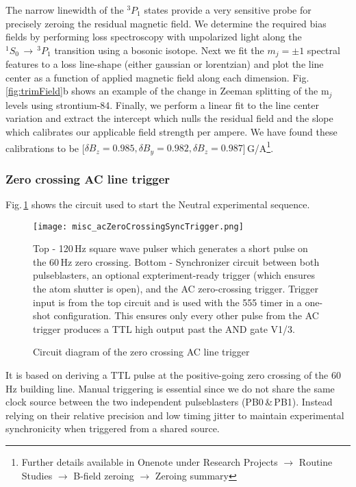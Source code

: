 The narrow linewidth of the $^3P_1$ states provide a very sensitive probe for precisely zeroing the residual magnetic field.
We determine the required bias fields by performing loss spectroscopy with unpolarized light along the $^1S_0\,\rightarrow\,^3P_1$ transition using a bosonic isotope.
Next we fit the $m_j=\pm1$ spectral features to a loss line-shape (either gaussian or lorentzian) and plot the line center as a function of applied magnetic field along each dimension.
Fig.\,\ref{fig:trimField}b shows an example of the change in Zeeman splitting of the m$_j$ levels using strontium-84.
Finally, we perform a linear fit to the line center variation and extract the intercept which nulls the residual field and the slope which calibrates our applicable field strength per ampere. 
We have found these calibrations to be [$\delta B_z = 0.985, \delta B_y = 0.982, \delta B_z = 0.987$]\,G/A\footnote{Further details available in Onenote under Research Projects $\rightarrow$ Routine Studies $\rightarrow$ B-field zeroing $\rightarrow$ Zeroing summary}.

\subsubsection{Zero crossing AC line trigger} \label{sec:expTrig}
Fig.\,\ref{fig:zeroCrossTrig} shows the circuit used to start the Neutral experimental sequence.
	\begin{figure}
		\centerline{
		\texttt{[image: misc\_acZeroCrossingSyncTrigger.png]}}
		\caption{Circuit diagram of the zero crossing AC line trigger}{Top - 120\,Hz square wave pulser which generates a short pulse on the 60\,Hz zero crossing. Bottom - Synchronizer circuit between both pulseblasters, an optional expteriment-ready trigger (which ensures the atom shutter is open), and the AC zero-crossing trigger. Trigger input is from the top circuit and is used with the 555 timer in a one-shot configuration. This ensures only every other pulse from the AC trigger produces a TTL high output past the AND gate V1/3.}
		\label{fig:zeroCrossTrig}
	\end{figure} 
It is based on deriving a TTL pulse at the positive-going zero crossing of the 60\,Hz building line.
Manual triggering is essential since we do not share the same clock source between the two independent pulseblasters (PB0\,\&\,PB1).
Instead relying on their relative precision and low timing jitter to maintain experimental synchronicity when triggered from a shared source.

